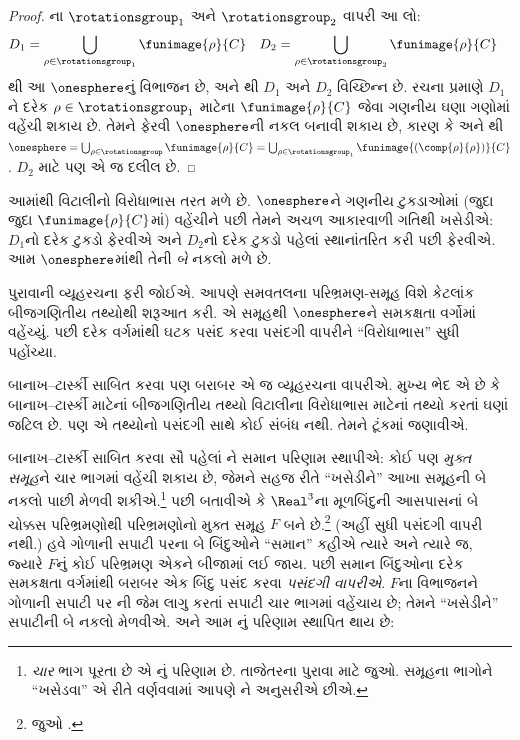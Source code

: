 \begin{proof}
ના
$\rotationsgroup_{1}$ અને
$\rotationsgroup_{2}$ વાપરી આ લો:
\begin{align*}
	D_{1} &= \bigcup_{\rho \in \rotationsgroup_1} \funimage{\rho}{C} & 
	D_{2} &= \bigcup_{\rho \in \rotationsgroup_2} \funimage{\rho}{C}
\end{align*}
થી આ
$\onesphere$નું વિભાજન છે, અને
થી
$D_1$ અને $D_2$ વિચ્છિન્ન છે.
રચના પ્રમાણે $D_1$ને દરેક
$\rho \in \rotationsgroup_1$ માટેના
$\funimage{\rho}{C}$ જેવા ગણનીય
ઘણા ગણોમાં વહેંચી શકાય છે.
તેમને ફેરવી $\onesphere$ની
નકલ બનાવી શકાય છે, કારણ કે
 અને
થી
$\onesphere = \bigcup_{\rho \in
\rotationsgroup}\funimage{\rho}{C} =
\bigcup_{\rho \in
\rotationsgroup_1}\funimage{(\comp{\rho}{\rho})}{C}$.
$D_2$ માટે પણ એ જ દલીલ છે.
\end{proof}\noindent
આમાંથી વિટાલીનો વિરોધાભાસ
તરત મળે છે. $\onesphere$ને
ગણનીય ટુકડાઓમાં (જુદા જુદા
$\funimage{\rho}{C}$માં) વહેંચીને
પછી તેમને અચળ આકારવાળી ગતિથી
ખસેડીએ: $D_1$નો દરેક ટુકડો
ફેરવીએ અને $D_2$નો દરેક ટુકડો
પહેલાં સ્થાનાંતરિત કરી પછી
ફેરવીએ. આમ $\onesphere$માંથી
તેની \emph{બે} નકલો મળે છે.

પુરાવાની વ્યૂહરચના ફરી જોઈએ.
આપણે સમવતલના પરિભ્રમણ-સમૂહ
વિશે કેટલાંક બીજગણિતીય તથ્યોથી
શરૂઆત કરી. એ સમૂહથી
$\onesphere$ને સમકક્ષતા વર્ગોમાં
વહેંચ્યું. પછી દરેક વર્ગમાંથી
ઘટક પસંદ કરવા પસંદગી વાપરીને
``વિરોધાભાસ'' સુધી પહોંચ્યા.

બાનાખ--ટાર્સ્કી સાબિત કરવા પણ
બરાબર એ જ વ્યૂહરચના વાપરીએ.
મુખ્ય ભેદ એ છે કે બાનાખ--ટાર્સ્કી
માટેનાં બીજગણિતીય તથ્યો
વિટાલીના વિરોધાભાસ માટેનાં
તથ્યો કરતાં ઘણાં જટિલ છે.
પણ એ તથ્યોનો પસંદગી સાથે
કોઈ સંબંધ નથી. તેમને ટૂંકમાં
જણાવીએ.

બાનાખ--ટાર્સ્કી સાબિત કરવા
સૌ પહેલાં ને
સમાન પરિણામ સ્થાપીએ: કોઈ પણ
\emph{મુક્ત સમૂહ}ને ચાર ભાગમાં
વહેંચી શકાય છે, જેમને સહજ રીતે
``ખસેડીને'' આખા સમૂહની બે
નકલો પાછી મેળવી શકીએ.\footnote{
\emph{ચાર} ભાગ પૂરતા છે એ
\cite{Robinson1947}નું પરિણામ છે.
તાજેતરના પુરાવા માટે
\citet[Theorem 5.2]{Wagon2016} જુઓ.
સમૂહના ભાગોને ``ખસેડવા''
એ રીતે વર્ણવવામાં આપણે
\citet[p.~3]{Weston2003}ને
અનુસરીએ છીએ.}
પછી બતાવીએ કે $\Real^3$ના
મૂળબિંદુની આસપાસનાં બે ચોક્કસ
પરિભ્રમણોથી પરિભ્રમણોનો
મુક્ત સમૂહ $F$ બને છે.\footnote{જુઓ
\citet[Theorem 2.1]{Wagon2016}.}
(અહીં સુધી પસંદગી વાપરી નથી.)
હવે ગોળાની સપાટી પરના બે
બિંદુઓને ``સમાન'' કહીએ ત્યારે
અને ત્યારે જ, જ્યારે $F$નું
કોઈ પરિભ્રમણ એકને બીજામાં લઈ
જાય. પછી સમાન બિંદુઓના
દરેક સમકક્ષતા વર્ગમાંથી બરાબર
એક બિંદુ પસંદ કરવા
\emph{પસંદગી વાપરીએ}. $F$ના
વિભાજનને ગોળાની સપાટી પર
ની
જેમ લાગુ કરતાં સપાટી ચાર
ભાગમાં વહેંચાય છે; તેમને
``ખસેડીને'' સપાટીની બે નકલો
મેળવીએ. અને આમ
\citep{Hausdorff1914}નું પરિણામ
સ્થાપિત થાય છે:

